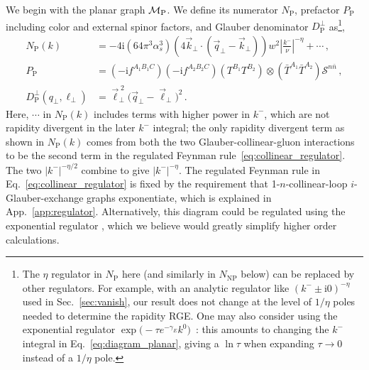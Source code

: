 \documentclass[letterpaper,11pt]{article}
\def\cS{\mathcal{S}}
\newcommand{\eq}[1]{Eq.~\eqref{eq:#1}}
\renewcommand{\sec}[1]{Sec.~\ref{sec:#1}}
\newcommand{\app}[1]{App.~\ref{app:#1}}
\newcommand{\abs}[1]{\lvert#1\rvert}
\newcommand{\img}{\mathrm{i}}
\newcommand{\cM}{\mathcal{M}}
\newcommand{\as}{\alpha_s}
\newcommand{\nn}{\nonumber}
\newcommand\prp[1]{\vec #1_\perp}
\newcommand\prpsqm[2]{\bigl( \prp{#1} \!-\! \prp{#2} \bigr)^{\!2}}
\newcommand\prnth[1]{\left(#1\right)}
\newcommand{\bn}{{\bar n}}
\newcommand{\bT}{{\bar T}}
\begin{document}
We begin with the planar graph $\cM_{\rm{P}}$. We define its numerator $N_\text{P}$, prefactor $P_{\text{P}}$ including color and external spinor factors, and Glauber denominator $D_{\text{P}}^\perp$ as\footnote{
  The $\eta$ regulator in $N_\text{P}$ here (and similarly in $N_\text{NP}$ below) can be replaced by other regulators. For example, with an analytic regulator like $(k^-\pm\img0)^{-\eta}$ used in \sec{vanish}, our result does not change at the level of $1/\eta$ poles needed to determine the rapidity RGE.
  One may also consider using the exponential regulator $\exp{\bigl(-\tau e^{-\gamma_E}k^0\bigr)}$~\cite{Li:2016axz}: this amounts to changing the $k^-$ integral in \eq{diagram_planar}, giving a $\ln\tau$ when expanding $\tau\to0$ instead of a $1/\eta$ pole.
},
%
\begin{align}
	N_\text{P}(k) &= -4 \img (64 \pi^3 \as^3) \left( 4 \prp{k} \cdot (\prp{q} - \prp{k})\right) w^2 \left|\frac{k^-}{\nu}\right|^{-\eta}+\cdots\,,
	\nn \\
	P_\text{P} &= \prnth{-\img f^{A_1B_1C}} \prnth{-\img f^{A_2B_2C}} \prnth{T^{B_1} T^{B_2}} \otimes \prnth{\bT^{A_1} \bT^{A_2}} \cS^{n\bn}\,,
	\nn \\
	D_\text{P}^\perp(q_\perp,\ell_\perp) &= \vec\ell_\perp^{\;2} \prpsqm{q}{\ell}\, .
\end{align}
Here, $\cdots$ in $N_\text{P}(k)$ includes terms with higher power in $k^-$, which are not rapidity divergent in the later $k^-$ integral;
the only rapidity divergent term as shown in $N_\text{P}(k)$ comes from both the two Glauber-collinear-gluon interactions to be the second term in the regulated Feynman rule~\eqref{eq:collinear_regulator}. The two $\abs{k^-}^{-\eta/2}$ combine to give $\abs{k^-}^{-\eta}$. The regulated Feynman rule in \eq{collinear_regulator} is fixed by the requirement that 1-$n$-collinear-loop $i$-Glauber-exchange graphs exponentiate, which is explained in \app{regulator}.
Alternatively, this diagram could be regulated using the exponential regulator \cite{Li:2016axz}, which we believe would greatly simplify higher order calculations.
\end{document}
